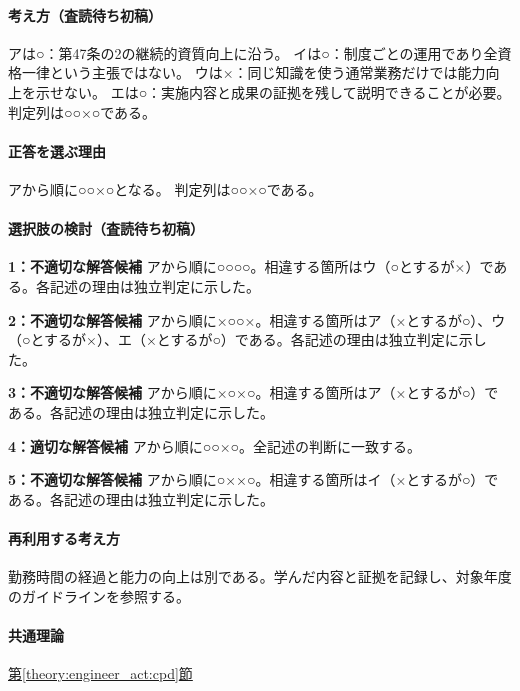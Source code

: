 \paragraph{考え方（査読待ち初稿）} アは○：第47条の2の継続的資質向上に沿う。 イは○：制度ごとの運用であり全資格一律という主張ではない。 ウは×：同じ知識を使う通常業務だけでは能力向上を示せない。 エは○：実施内容と成果の証拠を残して説明できることが必要。 判定列は○○×○である。

\paragraph{正答を選ぶ理由} アから順に○○×○となる。  判定列は○○×○である。

\paragraph{選択肢の検討（査読待ち初稿）}\mbox{}\par

\noindent\textbf{1：不適切な解答候補} アから順に○○○○。相違する箇所はウ（○とするが×）である。各記述の理由は独立判定に示した。\par

\noindent\textbf{2：不適切な解答候補} アから順に×○○×。相違する箇所はア（×とするが○）、ウ（○とするが×）、エ（×とするが○）である。各記述の理由は独立判定に示した。\par

\noindent\textbf{3：不適切な解答候補} アから順に×○×○。相違する箇所はア（×とするが○）である。各記述の理由は独立判定に示した。\par

\noindent\textbf{4：適切な解答候補} アから順に○○×○。全記述の判断に一致する。\par

\noindent\textbf{5：不適切な解答候補} アから順に○××○。相違する箇所はイ（×とするが○）である。各記述の理由は独立判定に示した。\par

\paragraph{再利用する考え方} 勤務時間の経過と能力の向上は別である。学んだ内容と証拠を記録し、対象年度のガイドラインを参照する。

\paragraph{共通理論} \hyperref[theory:engineer_act:cpd]{第\ref*{theory:engineer_act:cpd}節}

